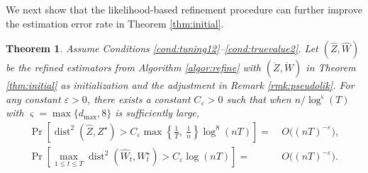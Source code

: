 \documentclass[12pt]{article}
\newtheorem{theorem}{Theorem}
\newtheorem{remark}{Remark}
\newcommand{\dmax}{d_{\operatorname{max}}}
\begin{document}
We next show that the likelihood-based refinement procedure can further improve the estimation error rate in Theorem \ref{thm:initial}. 


\begin{theorem} \label{thm:onestep} 
Assume Conditions \ref{cond:tuning12}--\ref{cond:truevalue2}.
Let $(\hat Z, \hat{W})$ be the refined estimators from Algorithm \ref{algor:refine} with $(\mathring{Z},\mathring{W})$ in Theorem \ref{thm:initial} as initialization and the adjustment in Remark \ref{rmk:pseudolik}. For any constant $\varepsilon>0$, there exists a constant $C_\varepsilon > 0$ such that when $n/ \log^{\varsigma}(T) $ with  $\varsigma = \max\{\dmax,8\} $ is sufficiently large, 
\begin{align}
\Pr\left[
\operatorname{dist}^2(\hat Z, Z^\star) >
   C_\varepsilon \max\left\{\frac{1}{T} ,\ \frac{1}{n}\right\} \log^{8}(nT)
\right] = &~O\big((nT)^{-\varepsilon}\big),\label{eq:zhaterr}\\
\Pr\left[ \max_{1\leqslant t \leqslant T} %
\operatorname{dist}^2(\hat W_t, W_t^\star) > %
   C_\varepsilon  \log(nT) 
\right] = &~O\big((nT)^{-\varepsilon}\big).\label{eq:wthaterr}
\end{align}

\end{theorem}

\end{document}
